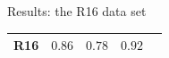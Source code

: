 \documentclass{beamer}
\def\wct#1{\textcolor{white}{#1}}
\newcommand{\NGC}{\mathrm{NGC4258}}
\begin{document}
\begin{frame}{Results: the R16 data set}
{\begin{table}[tbp]
\begin{tabular}{@{}ccccc}
 R16 &  $ 0.86 $ & $ 0.78 $ & $0.92$  \\
  

\hline
\end{tabular}
\end{table}}



\end{frame}
\end{document}
